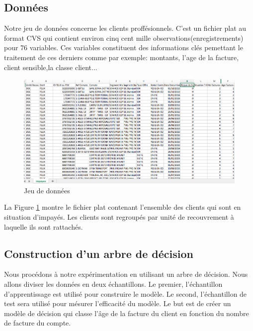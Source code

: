 \documentclass[11pt,a4paper]{report}
\begin{document}
\subsection{Données \label{jeux_données}}  
 Notre jeu  de données concerne les clients proffésionnels. C'est un fichier plat au format CVS qui contient environ cinq cent mille observations(enregistrements) pour 76 variables. Ces variables constituent des informations clés pemettant le traitement de ces derniers comme par exemple: montants, l'age de la facture, client sensible,la classe client...  
     \begin{figure}[h]
%
%
%
   \centering
   \includegraphics[scale=0.40]{jd.png}
     \caption{Jeu de données}
     \label{donnees}
\end{figure}
La Figure \ref{donnees} montre le fichier plat contenant l'ensemble des clients qui sont en situation d'impayés. Les clients sont regroupés par unité de recouvrement à laquelle ils sont rattachés. 

\subsection{Construction d'un arbre de décision}
Nous procédons à notre expérimentation en utilisant un arbre de décision. Nous allons diviser les données en deux échantillons. Le premier, l'échantillon d'apprentissage est utilisé pour construire le modèle. Le second, l'échantillon de test sera utilisé pour mésurer l'efficacité du modèle. Le but est de créer un modèle de décision qui classe l'âge de la facture du client en fonction du nombre de facture du compte. 
\end{document}
